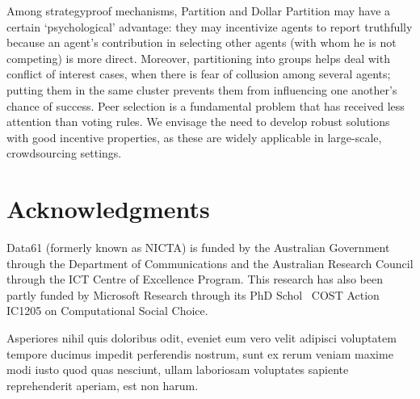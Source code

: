 \documentclass[letterpaper]{article}
\begin{document}
Among strategyproof mechanisms, Partition and Dollar Partition may
have a certain `psychological' advantage: they may incentivize agents to report truthfully because an agent's contribution in selecting other agents (with whom he is not competing) is more direct.
Moreover, partitioning into groups helps deal with conflict of interest cases, when there is fear of collusion among several agents; putting them in the same cluster prevents them from influencing one another's chance of success.
Peer selection is a fundamental problem that has received less attention than voting rules.  We envisage the need to develop robust solutions with good incentive properties, as these are widely applicable in large-scale, crowdsourcing settings.

\vspace{-1.73mm}
\section*{Acknowledgments}
Data61 (formerly known as NICTA) is funded by the Australian Government through the Department of Communications and the Australian Research Council through the ICT Centre of Excellence Program. This research has also been partly funded by Microsoft Research through its PhD Schol \ COST Action IC1205 on Computational Social Choice.

\normalsize

Asperiores nihil quis doloribus odit, eveniet eum vero velit adipisci voluptatem tempore ducimus impedit perferendis nostrum, sunt ex rerum veniam maxime modi iusto quod quas nesciunt, ullam laboriosam voluptates sapiente reprehenderit aperiam, est non harum.\clearpage

\end{document}
